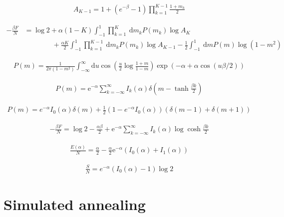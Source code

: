 \documentclass{article}
\begin{document}
\begin{align*}
A_{K-1} = 1 + \left( e^{-\beta} - 1 \right) \prod_{k=1}^{K-1} \frac{1+m_k}{2} \tag{9.54}
\end{align*}

\begin{align*}
-\frac{\beta F}{N} &= \log 2+\alpha(1-K) \int_{-1}^{1} \prod_{k=1}^{K} \mathrm{~d} m_{k} P\left(m_{k}\right) \log A_{K} \\
&\qquad \qquad +\frac{\alpha K}{2} \int_{-1}^{1} \prod_{k=1}^{K-1} \mathrm{~d} m_{k} P\left(m_{k}\right) \log A_{K-1}-\frac{1}{2} \int_{-1}^{1} \mathrm{~d} m P(m) \log \left(1-m^{2}\right)
\tag{9.55}
\end{align*}

\begin{align*}
P(m)=\frac{1}{2 \pi\left(1-m^{2}\right)} \int_{-\infty}^{\infty} \mathrm{d} u \cos \left(\frac{u}{2} \log \frac{1+m}{1-m}\right) \exp \left(-\alpha+\alpha \cos (u \beta / 2)\right)
\tag{9.56}
\end{align*}

\begin{align*}
P(m)=\mathrm{e}^{-\alpha} \sum_{k=-\infty}^{\infty} I_{k}(\alpha) \delta\left(m-\tanh \frac{\beta k}{2}\right) \tag{9.57}
\end{align*}

\begin{align*}
P(m) = e^{-\alpha} I_0(\alpha) \delta(m) + \frac{1}{2} \left( 1 - e^{-\alpha} I_0(\alpha) \right) \left( \delta(m - 1) + \delta(m + 1) \right) \tag{9.58}
\end{align*}

\begin{align*}
-\frac{\beta F}{N}=\log 2-\frac{\alpha \beta}{2}+\mathrm{e}^{-\alpha} \sum_{k=-\infty}^{\infty} I_{k}(\alpha) \log \cosh \frac{\beta k}{2} \tag{9.59}
\end{align*}

\begin{align*}
\frac{E(\alpha)}{N}=\frac{\alpha}{2}-\frac{\alpha}{2} \mathrm{e}^{-\alpha}\left(I_{0}(\alpha)+I_{1}(\alpha)\right) \tag{9.60}
\end{align*}

\begin{align*}
\frac{S}{N} = e^{-\alpha} \left( I_0(\alpha) - 1 \right) \log 2 \tag{9.61}
\end{align*}

\clearpage

\section{Simulated annealing}
\end{document}
